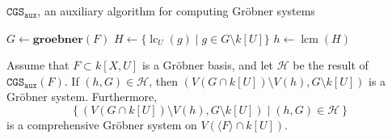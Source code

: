 \documentclass[a4paper, 12pt]{article}
\DeclareMathOperator{\LC}{lc}
\DeclareMathOperator{\lcm}{lcm}
\theoremstyle{changedot}
\theoremstyle{changedotbreak}
\theoremstyle{nonumberplain}
\begin{document}
\begin{algorithm}
  \caption{$\mathtt{CGS_{aux}}$, an auxiliary algorithm for computing Gröbner systems}
  $G \gets \mathbf{groebner}(F)$\;
  $H \gets \{\LC_{U}(g) \mid g \in G \setminus k[U]\}$\;
  $h \gets \lcm(H)$\;
\end{algorithm}

\begin{lemma}
  Assume that $F \subset k[X, U]$ is a Gröbner basis, and let $\mathcal H$ be the result of $\mathtt{CGS_{aux}}(F)$. If $(h, G) \in \mathcal H$, then $(V(G \cap k[U]) \setminus V(h), G \setminus k[U])$ is a Gröbner system. Furthermore,
  \[\left\{(V(G \cap k[U]) \setminus V(h), G \setminus k[U]) \mid (h, G) \in \mathcal H\right\}\]
  is a comprehensive Gröbner system on $V(\langle F \rangle \cap k[U])$.
\end{lemma}
\end{document}

